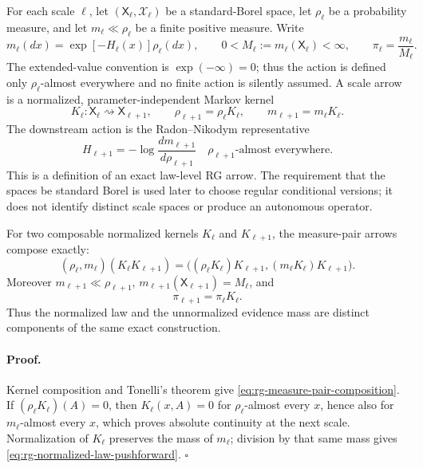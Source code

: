 For each scale \(\ell\), let \((\mathsf X_\ell,\mathscr X_\ell)\) be a
standard-Borel space, let \(\rho_\ell\) be a probability measure, and let
\(m_\ell\ll\rho_\ell\) be a finite positive measure.  Write
\begin{equation}
m_\ell(dx)=\exp[-H_\ell(x)]\rho_\ell(dx),
\qquad
0<M_\ell:=m_\ell(\mathsf X_\ell)<\infty,
\qquad
\pi_\ell=\frac{m_\ell}{M_\ell}.
\label{eq:rg-measure-pair-normalization}
\end{equation}
The extended-value convention is \(\exp(-\infty)=0\); thus the action is
defined only \(\rho_\ell\)-almost everywhere and no finite action is
silently assumed.  A scale arrow is a normalized, parameter-independent
Markov kernel
\begin{equation}
K_\ell:\mathsf X_\ell\rightsquigarrow\mathsf X_{\ell+1},
\qquad
\rho_{\ell+1}=\rho_\ell K_\ell,
\qquad
m_{\ell+1}=m_\ell K_\ell.
\label{eq:rg-measure-pair-arrow}
\end{equation}
The downstream action is the Radon--Nikodym representative
\begin{equation}
H_{\ell+1}=-\log\frac{dm_{\ell+1}}{d\rho_{\ell+1}}
\quad \rho_{\ell+1}\text{-almost everywhere}.
\label{eq:rg-measure-pair-action}
\end{equation}
This is a definition of an exact law-level RG arrow.  The requirement that
the spaces be standard Borel is used later to choose regular conditional
versions; it does not identify distinct scale spaces or produce an
autonomous operator. 

For two composable normalized kernels \(K_\ell\) and \(K_{\ell+1}\), the
measure-pair arrows compose exactly:
\begin{equation}
(\rho_\ell,m_\ell)(K_\ell K_{\ell+1})
=\bigl((\rho_\ell K_\ell)K_{\ell+1},
(m_\ell K_\ell)K_{\ell+1}\bigr).
\label{eq:rg-measure-pair-composition}
\end{equation}
Moreover \(m_{\ell+1}\ll\rho_{\ell+1}\),
\(m_{\ell+1}(\mathsf X_{\ell+1})=M_\ell\), and
\begin{equation}
\pi_{\ell+1}=\pi_\ell K_\ell.
\label{eq:rg-normalized-law-pushforward}
\end{equation}
Thus the normalized law and the unnormalized evidence mass are distinct
components of the same exact construction. 

\paragraph{Proof.}
Kernel composition and Tonelli's theorem give
\eqref{eq:rg-measure-pair-composition}.  If
\((\rho_\ell K_\ell)(A)=0\), then
\(K_\ell(x,A)=0\) for \(\rho_\ell\)-almost every \(x\), hence also for
\(m_\ell\)-almost every \(x\), which proves absolute continuity at the
next scale.  Normalization of \(K_\ell\) preserves the mass of
\(m_\ell\); division by that same mass gives
\eqref{eq:rg-normalized-law-pushforward}.  \(\square\)


